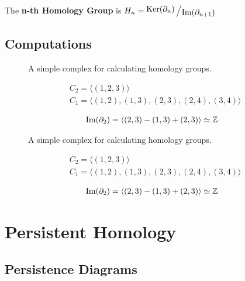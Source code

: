 \begin{frame}
	\begin{definition}
		The \textbf{n-th Homology Group} is \(H_n = \bigslant{\Ker(\partial_n)}{\Ima(\partial_{n+1})}\)
		\cite{fraleigha}
	\end{definition}
\end{frame}

\subsection{Computations}
\begin{frame}
	\begin{figure}
		
		\caption{A simple complex for calculating homology groups.}
	\end{figure}
	\begin{align*}
		&C_2 = \langle (1,2,3) \rangle \\
		&C_1 = \langle (1,2),(1,3),(2,3),(2,4),(3,4) \rangle \\
	\end{align*}
	\begin{align*}
		\operatorname{Im} (\partial_2) = \langle (2,3) - (1,3) + (2,3) \rangle \simeq \mathbb{Z}
	\end{align*}
\end{frame}

\begin{frame}
	\begin{figure}
		
		\caption{A simple complex for calculating homology groups.}
	\end{figure}
	\begin{align*}
		&C_2 = \langle (1,2,3) \rangle \\
		&C_1 = \langle (1,2),(1,3),(2,3),(2,4),(3,4) \rangle \\
	\end{align*}
	\begin{align*}
		\operatorname{Im} (\partial_2) = \langle (2,3) - (1,3) + (2,3) \rangle \simeq \mathbb{Z}
	\end{align*}
\end{frame}





\section[Persistence]{Persistent Homology}
\subsection{Persistence Diagrams}
\begin{frame}
\end{frame}

